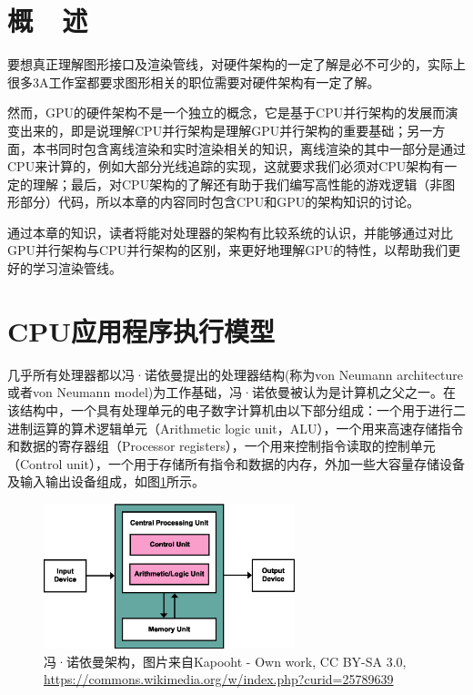 \section{概~~述}
要想真正理解图形接口及渲染管线，对硬件架构的一定了解是必不可少的，实际上很多3A工作室都要求图形相关的职位需要对硬件架构有一定了解。

然而，GPU的硬件架构不是一个独立的概念，它是基于CPU并行架构的发展而演变出来的，即是说理解CPU并行架构是理解GPU并行架构的重要基础；另一方面，本书同时包含离线渲染和实时渲染相关的知识，离线渲染的其中一部分是通过CPU来计算的，例如大部分光线追踪的实现，这就要求我们必须对CPU架构有一定的理解；最后，对CPU架构的了解还有助于我们编写高性能的游戏逻辑（非图形部分）代码，所以本章的内容同时包含CPU和GPU的架构知识的讨论。

通过本章的知识，读者将能对处理器的架构有比较系统的认识，并能够通过对比GPU并行架构与CPU并行架构的区别，来更好地理解GPU的特性，以帮助我们更好的学习渲染管线。




\section{CPU应用程序执行模型}
几乎所有处理器都以冯·诺依曼提出的处理器结构(称为von Neumann architecture或者von Neumann model)为工作基础，冯·诺依曼被认为是计算机之父之一。在该结构中，一个具有处理单元的电子数字计算机由以下部分组成：一个用于进行二进制运算的算术逻辑单元（Arithmetic logic unit，ALU），一个用来高速存储指令和数据的寄存器组（Processor registers），一个用来控制指令读取的控制单元（Control unit），一个用于存储所有指令和数据的内存，外加一些大容量存储设备及输入输出设备组成，如图\ref{f:rp-Neumann-Architecture}所示。

\begin{figure}
\sidecaption
	\includegraphics[width=0.65\textwidth]{figures/rp/Von-Neumann-Architecture}
	\caption{冯·诺依曼架构，图片来自Kapooht - Own work, CC BY-SA 3.0, \protect\url{https://commons.wikimedia.org/w/index.php?curid=25789639}}
	\label{f:rp-Neumann-Architecture}
\end{figure}


